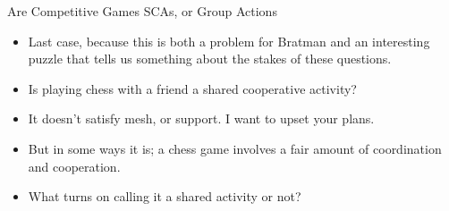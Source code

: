 \documentclass[
  ignorenonframetext,
]{beamer}
\providecommand{\tightlist}{%
  \setlength{\itemsep}{0pt}\setlength{\parskip}{0pt}}
\begin{document}
\begin{frame}{Are Competitive Games SCAs, or Group Actions}
\protect\hypertarget{are-competitive-games-scas-or-group-actions}{}
\begin{itemize}
\tightlist
\item
  Last case, because this is both a problem for Bratman and an
  interesting puzzle that tells us something about the stakes of these
  questions.
\item
  Is playing chess with a friend a shared cooperative activity?
\item
  It doesn't satisfy mesh, or support. I want to upset your plans.
\item
  But in some ways it is; a chess game involves a fair amount of
  coordination and cooperation. \pause
\item
  What turns on calling it a shared activity or not?
\end{itemize}
\end{frame}
\end{document}
